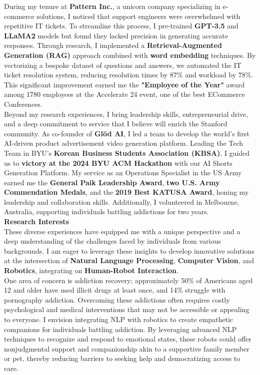 \documentclass{article}
\begin{document}
During my tenure at \textbf{Pattern Inc.}, a unicorn company specializing in e-commerce solutions, I noticed that support engineers were overwhelmed with repetitive IT tickets. To streamline this process, I pre-trained \textbf{GPT-3.5} and \textbf{LLaMA2} models but found they lacked precision in generating accurate responses. Through research, I implemented a \textbf{Retrieval-Augmented Generation (RAG)} approach combined with \textbf{word embedding} techniques. By vectorizing a bespoke dataset of questions and answers, we automated the IT ticket resolution system, reducing resolution times by 87\% and workload by 78\%. This significant improvement earned me the \textbf{"Employee of the Year"} award among 1780 employees at the Accelerate 24 event, one of the best ECommerce Conferences.
\\

Beyond my research experiences, I bring leadership skills, entrepreneurial drive, and a deep commitment to service that I believe will enrich the Stanford community. As co-founder of \textbf{Glöd AI}, I led a team to develop the world's first AI-driven product advertisement video generation platform. Leading the Tech Team in BYU's \textbf{Korean Business Students Association (KBSA)}, I guided us to \textbf{victory at the 2024 BYU ACM Hackathon} with our AI Shorts Generation Platform. My service as an Operations Specialist in the US Army earned me the \textbf{General Paik Leadership Award}, \textbf{two U.S. Army Commendation Medals}, and the \textbf{2019 Best KATUSA Award}, honing my leadership and collaboration skills. Additionally, I volunteered in Melbourne, Australia, supporting individuals battling addictions for two years.
\\

\textbf{Research Interests}\\
These diverse experiences have equipped me with a unique perspective and a deep understanding of the challenges faced by individuals from various backgrounds. I am eager to leverage these insights to develop innovative solutions at the intersection of \textbf{Natural Language Processing}, \textbf{Computer Vision}, and \textbf{Robotics}, integrating on \textbf{Human-Robot Interaction}. 
\\

One area of concern is addiction recovery; approximately 50\% of Americans aged 12 and older have used illicit drugs at least once, and 14\% struggle with pornography addiction. Overcoming these addictions often requires costly psychological and medical interventions that may not be accessible or appealing to everyone. I envision integrating NLP with robotics to create empathetic companions for individuals battling addiction. By leveraging advanced NLP techniques to recognize and respond to emotional states, these robots could offer nonjudgmental support and companionship akin to a supportive family member or pet, thereby reducing barriers to seeking help and democratizing access to care.
\\
\end{document}
